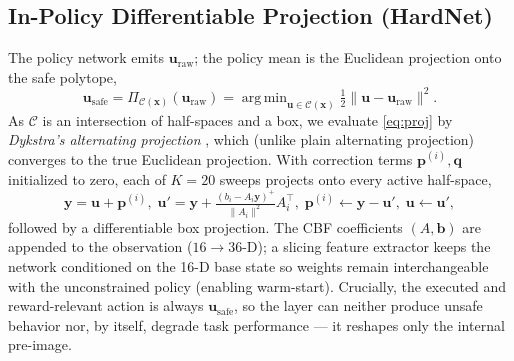 \documentclass[journal]{IEEEtran}
\DeclareMathOperator*{\argmin}{arg\,min}
\newcommand{\uraw}{\mathbf{u}_{\mathrm{raw}}}
\newcommand{\usafe}{\mathbf{u}_{\mathrm{safe}}}
\begin{document}
\subsection{In-Policy Differentiable Projection (HardNet)}
The policy network emits $\uraw$; the policy mean is the Euclidean projection
onto the safe polytope,
\begin{equation}
\usafe=\Pi_{\mathcal C(\mathbf x)}(\uraw)=
\argmin_{\mathbf u\in\mathcal C(\mathbf x)}\tfrac12\lVert\mathbf u-\uraw\rVert^2.
\label{eq:proj}
\end{equation}
As $\mathcal C$ is an intersection of half-spaces and a box, we evaluate
\eqref{eq:proj} by \emph{Dykstra's alternating projection}
\cite{dykstra1983projection}, which (unlike plain alternating projection)
converges to the true Euclidean projection. With correction terms
$\mathbf p^{(i)},\mathbf q$ initialized to zero, each of $K=20$ sweeps projects
onto every active half-space,
\begin{equation}
\mathbf y=\mathbf u+\mathbf p^{(i)},\;
\mathbf u'=\mathbf y+\tfrac{(b_i-A_i\mathbf y)^+}{\lVert A_i\rVert^2}A_i^\top,\;
\mathbf p^{(i)}\!\leftarrow\!\mathbf y-\mathbf u',\;
\mathbf u\!\leftarrow\!\mathbf u',
\label{eq:dykstra}
\end{equation}
followed by a differentiable box projection. The CBF coefficients
$(A,\mathbf b)$ are appended to the observation ($16\!\to\!36$-D); a slicing
feature extractor keeps the network conditioned on the 16-D base state so
weights remain interchangeable with the unconstrained policy (enabling
warm-start). Crucially, the executed and reward-relevant action is always
$\usafe$, so the layer can neither produce unsafe behavior nor, by itself,
degrade task performance --- it reshapes only the internal pre-image.
\end{document}

